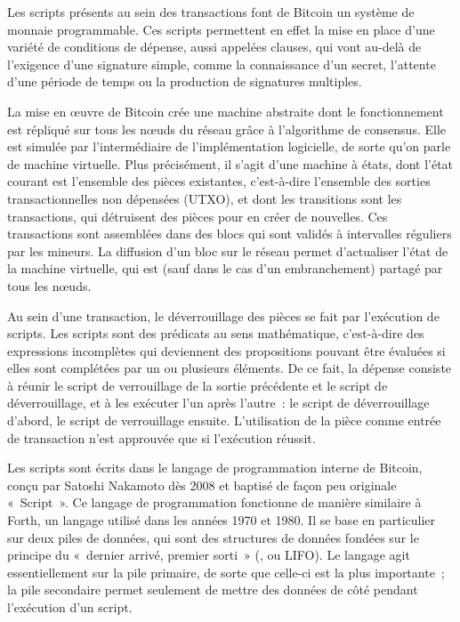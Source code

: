 Les scripts présents au sein des transactions font de Bitcoin un système de monnaie programmable. Ces scripts permettent en effet la mise en place d'une variété de conditions de dépense, aussi appelées clauses, qui vont au-delà de l'exigence d'une signature simple, comme la connaissance d'un secret, l'attente d'une période de temps ou la production de signatures multiples.

La mise en œuvre de Bitcoin crée une machine abstraite dont le fonctionnement est répliqué sur tous les nœuds du réseau grâce à l'algorithme de consensus. Elle est simulée par l'intermédiaire de l'implémentation logicielle, de sorte qu'on parle de machine virtuelle. Plus précisément, il s'agit d'une machine à états, dont l'état courant est l'ensemble des pièces existantes, c'est-à-dire l'ensemble des sorties transactionnelles non dépensées (UTXO), et dont les transitions sont les transactions, qui détruisent des pièces pour en créer de nouvelles. Ces transactions sont assemblées dans des blocs qui sont validés à intervalles réguliers par les mineurs. La diffusion d'un bloc sur le réseau permet d'actualiser l'état de la machine virtuelle, qui est (sauf dans le cas d'un embranchement) partagé par tous les nœuds.

Au sein d'une transaction, le déverrouillage des pièces se fait par l'exécution de scripts. Les scripts sont des prédicats au sens mathématique, c'est-à-dire des expressions incomplètes qui deviennent des propositions pouvant être évaluées si elles sont complétées par un ou plusieurs éléments. De ce fait, la dépense consiste à réunir le script de verrouillage de la sortie précédente et le script de déverrouillage, et à les exécuter l'un après l'autre~: le script de déverrouillage d'abord, le script de verrouillage ensuite. L'utilisation de la pièce comme entrée de transaction n'est approuvée que si l'exécution réussit.

Les scripts sont écrits dans le langage de programmation interne de Bitcoin, conçu par Satoshi Nakamoto dès 2008 et baptisé de façon peu originale «~Script~». Ce langage de programmation fonctionne de manière similaire à Forth, un langage utilisé dans les années 1970 et 1980. Il se base en particulier sur deux piles de données, qui sont des structures de données fondées sur le principe du «~dernier arrivé, premier sorti~» (, ou LIFO). Le langage agit essentiellement sur la pile primaire, de sorte que celle-ci est la plus importante~; la pile secondaire permet seulement de mettre des données de côté pendant l'exécution d'un script.

